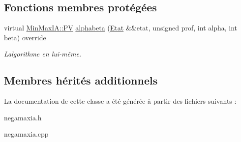 \subsection*{Fonctions membres protégées}
\begin{DoxyCompactItemize}
\item 
virtual \hyperlink{structIA_1_1PV}{Min\+Max\+I\+A\+::\+PV} \hyperlink{classNegaMaxIA_afe019dd4570ec304b9b6b9c56596a51a}{alphabeta} (\hyperlink{structEtat}{Etat} \&\&etat, unsigned prof, int alpha, int beta) override\hypertarget{classNegaMaxIA_afe019dd4570ec304b9b6b9c56596a51a}{}\label{classNegaMaxIA_afe019dd4570ec304b9b6b9c56596a51a}

\begin{DoxyCompactList}\small\item\em L\textquotesingle{}algorithme en lui-\/même. \end{DoxyCompactList}\end{DoxyCompactItemize}
\subsection*{Membres hérités additionnels}


La documentation de cette classe a été générée à partir des fichiers suivants \+:\begin{DoxyCompactItemize}
\item 
negamaxia.\+h\item 
negamaxia.\+cpp\end{DoxyCompactItemize}
